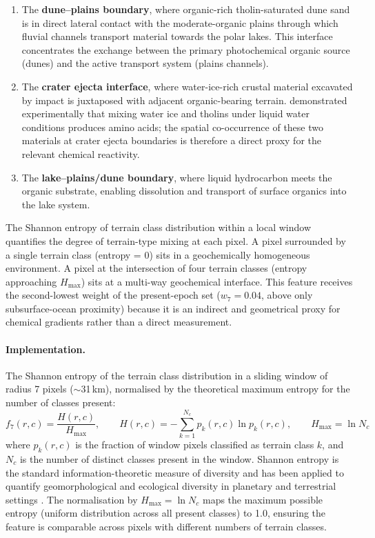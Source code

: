 \begin{enumerate}
  \item The \textbf{dune--plains boundary}, where organic-rich tholin-saturated
    dune sand is in direct lateral contact with the moderate-organic plains
    through which fluvial channels transport material towards the polar lakes.
    This interface concentrates the exchange between the primary
    photochemical organic source (dunes) and the active transport system
    (plains channels).

  \item The \textbf{crater ejecta interface}, where water-ice-rich crustal
    material excavated by impact is juxtaposed with adjacent organic-bearing
    terrain.  \citet{Neish2018} demonstrated experimentally that mixing
    water ice and tholins under liquid water conditions produces amino acids;
    the spatial co-occurrence of these two materials at crater ejecta
    boundaries is therefore a direct proxy for the relevant chemical
    reactivity.

  \item The \textbf{lake--plains/dune boundary}, where liquid hydrocarbon
    meets the organic substrate, enabling dissolution and transport of
    surface organics into the lake system.
\end{enumerate}

The Shannon entropy of terrain class distribution within a local window
quantifies the degree of terrain-type mixing at each pixel.  A pixel
surrounded by a single terrain class (entropy = 0) sits in a geochemically
homogeneous environment.  A pixel at the intersection of four terrain
classes (entropy approaching $H_\text{max}$) sits at a multi-way geochemical
interface.  This feature receives the second-lowest weight of the present-epoch set
($w_7 = 0.04$, above only subsurface-ocean proximity) because it is an indirect and geometrical proxy for chemical
gradients rather than a direct measurement.

\paragraph{Implementation.}
The Shannon entropy of the terrain class distribution in a sliding window
of radius 7 pixels ($\sim$31\,km), normalised by the theoretical maximum
entropy for the number of classes present:
\begin{equation}
  f_7(r,c) = \frac{H(r,c)}{H_\text{max}}, \qquad
  H(r,c) = -\sum_{k=1}^{N_c} p_k(r,c)\ln p_k(r,c), \qquad
  H_\text{max} = \ln N_c
  \label{eq:shannon}
\end{equation}
where $p_k(r,c)$ is the fraction of window pixels classified as terrain
class $k$, and $N_c$ is the number of distinct classes present in the window.
Shannon entropy is the standard information-theoretic measure of diversity
\citep{Shannon1948} and has been applied to quantify geomorphological and
ecological diversity in planetary and terrestrial settings \citep{NowosadStepinski2019}.
The normalisation by $H_\text{max} = \ln N_c$ maps the maximum possible
entropy (uniform distribution across all present classes) to 1.0, ensuring
the feature is comparable across pixels with different numbers of terrain
classes.

